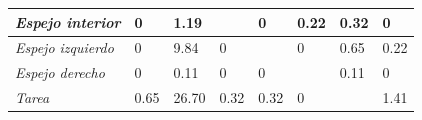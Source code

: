 \begin{table}[h]
\begin{tabular}{|llllllll|}
\multicolumn{1}{|l|}{\textit{Espejo interior}}                                                & \multicolumn{1}{l|}{\cellcolor[HTML]{FCFCFF}0}                                           & \multicolumn{1}{l|}{\cellcolor[HTML]{F5F8FE}1.19}  & \multicolumn{1}{l|}{\cellcolor[HTML]{C9C9C9}}                                            & \multicolumn{1}{l|}{\cellcolor[HTML]{FCFCFF}0}                                            & \multicolumn{1}{l|}{\cellcolor[HTML]{FBFCFF}0.22}                                       & \multicolumn{1}{l|}{\cellcolor[HTML]{FBFBFF}0.32}  & \cellcolor[HTML]{FCFCFF}0           \\ \hline
\multicolumn{1}{|l|}{\textit{Espejo izquierdo}}                                               & \multicolumn{1}{l|}{\cellcolor[HTML]{FCFCFF}0}                                           & \multicolumn{1}{l|}{\cellcolor[HTML]{C1D9F0}9.84}  & \multicolumn{1}{l|}{\cellcolor[HTML]{FCFCFF}0}                                           & \multicolumn{1}{l|}{\cellcolor[HTML]{C9C9C9}}                                             & \multicolumn{1}{l|}{\cellcolor[HTML]{FCFCFF}0}                                          & \multicolumn{1}{l|}{\cellcolor[HTML]{F9FAFE}0.65}  & \cellcolor[HTML]{FBFCFF}0.22        \\ \hline
\multicolumn{1}{|l|}{\textit{Espejo derecho}}                                                 & \multicolumn{1}{l|}{\cellcolor[HTML]{FCFCFF}0}                                           & \multicolumn{1}{l|}{\cellcolor[HTML]{FCFCFF}0.11}  & \multicolumn{1}{l|}{\cellcolor[HTML]{FCFCFF}0}                                           & \multicolumn{1}{l|}{\cellcolor[HTML]{FCFCFF}0}                                            & \multicolumn{1}{l|}{\cellcolor[HTML]{C9C9C9}}                                           & \multicolumn{1}{l|}{\cellcolor[HTML]{FCFCFF}0.11}  & \cellcolor[HTML]{FCFCFF}0           \\ \hline
\multicolumn{1}{|l|}{\textit{Tarea}}                                                          & \multicolumn{1}{l|}{\cellcolor[HTML]{F9FAFE}0.65}                                        & \multicolumn{1}{l|}{\cellcolor[HTML]{5B9BD5}26.70} & \multicolumn{1}{l|}{\cellcolor[HTML]{FBFBFF}0.32}                                        & \multicolumn{1}{l|}{\cellcolor[HTML]{FBFBFF}0.32}                                         & \multicolumn{1}{l|}{\cellcolor[HTML]{FCFCFF}0}                                          & \multicolumn{1}{l|}{\cellcolor[HTML]{C9C9C9}}      & \cellcolor[HTML]{F4F7FD}1.41        \\ \hline

\end{tabular}
\end{table}
